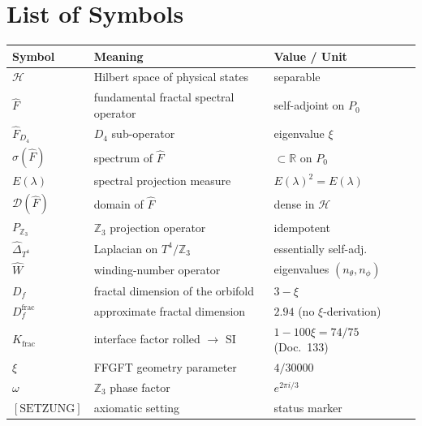 
\section*{List of Symbols}

\begin{center}
\begin{tabular}{lll}
\toprule
Symbol & Meaning & Value / Unit \\
\midrule
$\mathcal{H}$ & Hilbert space of physical states & separable \\
$\hat{F}$ & fundamental fractal spectral operator & self-adjoint on $P_0$ \\
$\hat{F}_{D_4}$ & $D_4$ sub-operator & eigenvalue $\xi$ \\
$\sigma(\hat{F})$ & spectrum of $\hat{F}$ & $\subset \mathbb{R}$ on $P_0$ \\
$E(\lambda)$ & spectral projection measure & $E(\lambda)^2 = E(\lambda)$ \\
$\mathcal{D}(\hat{F})$ & domain of $\hat{F}$ & dense in $\mathcal{H}$ \\
$P_{\mathbb{Z}_3}$ & $\mathbb{Z}_3$ projection operator & idempotent \\
$\hat{\Delta}_{T^4}$ & Laplacian on $T^4/\mathbb{Z}_3$ & essentially self-adj. \\
$\hat{W}$ & winding-number operator & eigenvalues $(n_\theta, n_\phi)$ \\
$D_f$ & fractal dimension of the orbifold & $3 - \xi$ \\
$D_f^{\mathrm{frac}}$ & approximate fractal dimension & $2.94$ (no $\xi$-derivation) \\
$K_{\mathrm{frac}}$ & interface factor rolled $\to$ SI & $1-100\xi = 74/75$ (Doc.~133) \\
$\xi$ & FFGFT geometry parameter & $4/30000$ \\
$\omega$ & $\mathbb{Z}_3$ phase factor & $e^{2\pi i/3}$ \\
$[\text{SETZUNG}]$ & axiomatic setting & status marker \\
\bottomrule
\end{tabular}
\end{center}

